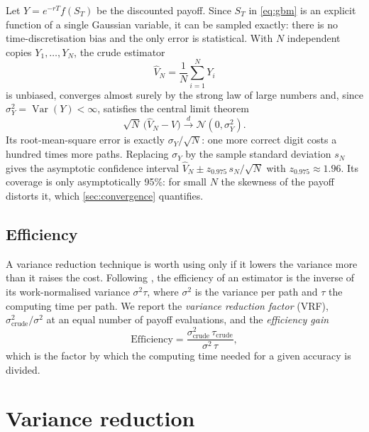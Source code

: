 \documentclass[11pt,a4paper]{article}
\newcommand{\Var}{\operatorname{Var}}
\newcommand{\N}{\mathcal{N}}
\newcommand{\1}{\mathbf{1}}
\theoremstyle{plain}
\theoremstyle{remark}
\begin{document}
Let $Y = e^{-rT} f(S_T)$ be the discounted payoff. Since $S_T$ in \eqref{eq:gbm} is an explicit function of a
single Gaussian variable, it can be sampled exactly: there is no time-discretisation bias and the only error is
statistical. With $N$ independent copies $Y_1, \dots, Y_N$, the crude estimator
\begin{equation}
  \hat V_N = \frac{1}{N} \sum_{i=1}^N Y_i
\end{equation}
is unbiased, converges almost surely by the strong law of large numbers and, since $\sigma_Y^2 = \Var(Y) <
\infty$, satisfies the central limit theorem
\begin{equation}
  \sqrt{N}\,\big(\hat V_N - V\big) \xrightarrow{\;d\;} \N(0, \sigma_Y^2).
\end{equation}
Its root-mean-square error is exactly $\sigma_Y/\sqrt{N}$: one more correct digit costs a hundred times more
paths. Replacing $\sigma_Y$ by the sample standard deviation $s_N$ gives the asymptotic confidence interval
$\hat V_N \pm z_{0.975}\, s_N/\sqrt{N}$ with $z_{0.975} \approx 1.96$. Its coverage is only asymptotically
95\%: for small $N$ the skewness of the payoff distorts it, which \cref{sec:convergence} quantifies.

\subsection{Efficiency}

A variance reduction technique is worth using only if it lowers the variance more than it raises the cost.
Following \citet{glynn1992}, the efficiency of an estimator is the inverse of its work-normalised variance
$\sigma^2 \tau$, where $\sigma^2$ is the variance per path and $\tau$ the computing time per path. We report the
\emph{variance reduction factor} (VRF), $\sigma^2_{\text{crude}}/\sigma^2$ at an equal number of payoff
evaluations, and the \emph{efficiency gain}
\begin{equation}
  \text{Efficiency} = \frac{\sigma^2_{\text{crude}}\, \tau_{\text{crude}}}{\sigma^2\, \tau},
  \label{eq:efficiency}
\end{equation}
which is the factor by which the computing time needed for a given accuracy is divided.

\section{Variance reduction}\label{sec:vr}
\end{document}
